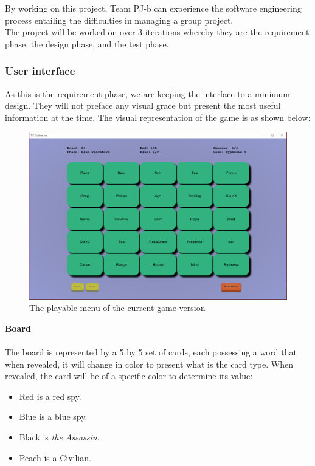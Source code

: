 \documentclass[10pt, a4paper]{article}
\begin{document}
	By working on this project, Team PJ-b can experience the software engineering process entailing the difficulties in managing a group project.\\
	
	The project will be worked on over 3 iterations whereby they are the requirement phase, the design phase, and the test phase.
	
	\subsubsection{User interface}
	
	As this is the requirement phase, we are keeping the interface to a minimum design. They will not preface any visual grace but present the most useful information at the time. The visual representation of the game is as shown below:\\
	
	\begin{center}
		\begin{figure}
			\caption{The playable menu of the current game version}
			\includegraphics[scale=0.2]{game_interface.png}
		\end{figure}
	\end{center}
	
	\textbf{Board}\\
	\\
	The board is represented by a 5 by 5 set of cards, each possessing a word that when revealed, it will change in color to present what is the card type. When revealed, the card will be of a specific color to determine its value:  
	\begin{itemize}
		\item Red is a red spy.
		\item Blue is a blue spy.
		\item Black is \textit{the Assassin}.
		\item Peach is a Civilian.
	\end{itemize}
	
\end{document}
